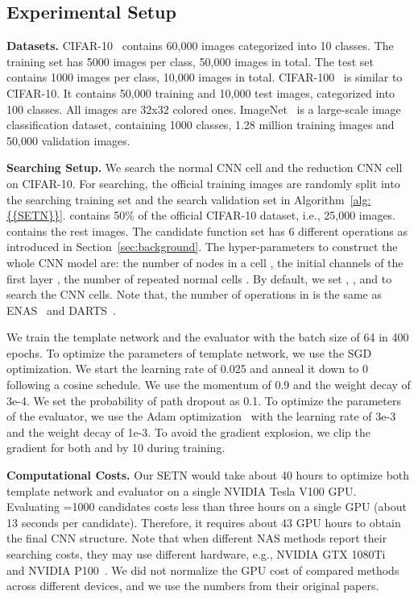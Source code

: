 \documentclass[10pt,twocolumn,letterpaper]{article}
\def\Secref#1{Section~\ref{#1}}
\def\Algref#1{Algorithm~\ref{#1}}
\def\NAME{{SETN}}
\begin{document}
\subsection{Experimental Setup}\label{sec:setup}

\textbf{Datasets.} CIFAR-10~\cite{krizhevsky2009learning} contains 60,000 images categorized into 10 classes. The training set has 5000 images per class, 50,000 images in total.
The test set contains 1000 images per class, 10,000 images in total.
{CIFAR-100}~\cite{krizhevsky2009learning} is similar to CIFAR-10.
It contains 50,000 training and 10,000 test images, categorized into 100 classes. All images are 32x32 colored ones.
{ImageNet}~\cite{russakovsky2015imagenet} is a large-scale image classification dataset, containing 1000 classes, 1.28 million training images and 50,000 validation images.



\textbf{Searching Setup.}
We search the normal CNN cell and the reduction CNN cell on CIFAR-10. For searching, the official training images are randomly split into the searching training set  and the search validation set  in \Algref{alg:{\NAME}}.  contains 50\% of the official CIFAR-10 dataset, i.e., 25,000 images.  contains the rest images.
The candidate function set  has 6 different operations as introduced in \Secref{sec:background}.
The hyper-parameters to construct the whole CNN model are:
the number of nodes in a cell , the initial channels of the first layer , the number of repeated normal cells .
By default, we set , , and  to search the CNN cells.
Note that, the number of operations in  is the same as ENAS~\cite{pmlr-v80-pham18a} and DARTS~\cite{liu2019darts}.


We train the template network and the evaluator with the batch size of 64 in 400 epochs.
To optimize the parameters  of template network, we use the SGD optimization.
We start the learning rate of 0.025 and anneal it down to 0 following a cosine schedule. We use the momentum of 0.9 and the weight decay of 3e-4. We set the probability of path dropout as 0.1.
To optimize the parameters  of the evaluator, we use the Adam optimization~\cite{kingma2015adam} with the learning rate of 3e-3 and the weight decay of 1e-3.
To avoid the gradient explosion, we clip the gradient for both  and  by 10 during training.


\textbf{Computational Costs.}
Our {\NAME} would take about 40 hours to optimize both template network and evaluator on a single NVIDIA Tesla V100 GPU.
Evaluating =1000 candidates costs less than three hours on a single GPU (about 13 seconds per candidate). Therefore, it requires about 43 GPU hours to obtain the final CNN structure.
Note that when different NAS methods report their searching costs, they may use different hardware, e.g., NVIDIA GTX 1080Ti~\cite{liu2019darts} and NVIDIA P100~\cite{Zoph_2018_CVPR}.
We did not normalize the GPU cost of compared methods across different devices, and we use the numbers from their original papers.
\end{document}
